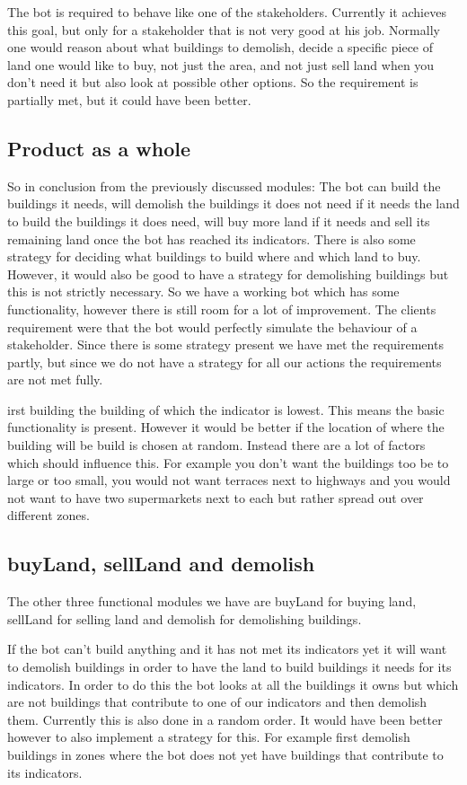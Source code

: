 The bot is required to behave like one of the stakeholders. Currently it achieves this goal, but only for a stakeholder that is not very good at his job. Normally one would reason about what buildings to demolish, decide a specific piece of land one would like to buy, not just the area, and not just sell land when you don't need it but also look at possible other options. So the requirement is partially met, but it could have been better.

\subsection{Product as a whole}
So in conclusion from the previously discussed modules: The bot can build the buildings it needs, will demolish the buildings it does not need if it needs the land to build the buildings it does need, will buy more land if it needs and sell its remaining land once the bot has reached its indicators. There is also some strategy for deciding what buildings to build where and which land to buy. However, it would also be good to have a strategy for demolishing buildings but this is not strictly necessary. So we have a working bot which has some functionality, however there is still room for a lot of improvement. The clients requirement were that the bot would perfectly simulate the behaviour of a stakeholder. Since there is some strategy present we have met the requirements partly, but since we do not have a strategy for all our actions the requirements are not met fully. 


\newpage

irst building the building of which the indicator is lowest. This means the basic functionality is present. However it would be better if the location of where the building will be build is chosen at random. Instead there are a lot of factors which should influence this. For example you don't want the buildings too be to large or too small, you would not want terraces next to highways and you would not want to have two supermarkets next to each but rather spread out over different zones.

\subsection{buyLand, sellLand and demolish}
The other three functional modules we have are buyLand for buying land, sellLand for selling land and demolish for demolishing buildings. 

If the bot can't build anything and it has not met its indicators yet it will want to demolish buildings in order to have the land to build buildings it needs for its indicators. In order to do this the bot looks at all the buildings it owns but which are not buildings that contribute to one of our indicators and then demolish them. Currently this is also done in a random order. It would have been better however to also implement a strategy for this. For example first demolish buildings in zones where the bot does not yet have buildings that contribute to its indicators. 

